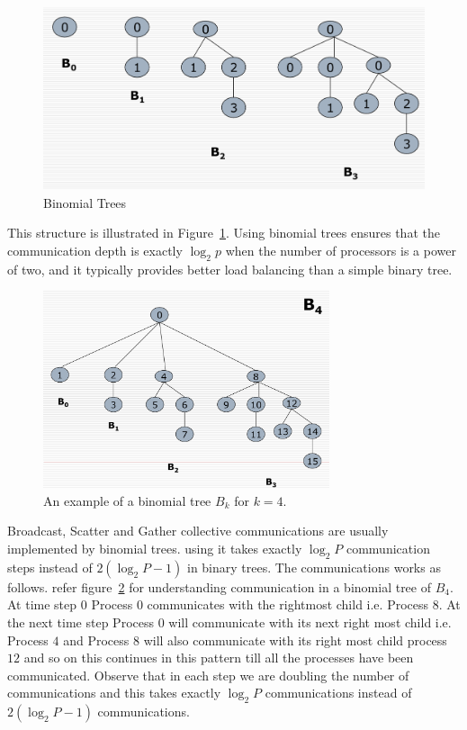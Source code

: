 \documentclass[12pt]{book}
\begin{document}
\begin{figure}
    \centering
    \includegraphics[width=0.75\linewidth]{images/binomial_trees.png}
    \caption{Binomial Trees}
    \label{fig:binom_trees}
\end{figure}
This structure is illustrated in Figure~\ref{fig:binom_trees}. Using binomial trees ensures that the communication depth is exactly $\log_2 p$ when the number of processors is a power of two, and it typically provides better load balancing than a simple binary tree.

\begin{figure}[H]
    \centering
    \includegraphics[width=0.75\textwidth]{images/binomial_tree_example.png}
    \caption{An example of a binomial tree $B_k$ for $k=4$.}
    \label{fig:binomial_tree}
\end{figure}

Broadcast, Scatter and Gather collective communications are usually implemented by binomial trees. using it takes exactly $\log_2 P$ communication steps instead of $2(\log_2 P -1)$ in binary trees. The communications works as follows. refer figure~\ref{fig:binomial_tree} for understanding communication in a binomial tree of $B_4$. At time step $0$ Process $0$ communicates with the rightmost child i.e. Process $8$. At the next time step Process $0$ will communicate with its next right most child i.e. Process $4$ and Process $8$ will also communicate with its right most child process $12$ and so on this continues in this pattern till all the processes have been communicated. Observe that in each step we are doubling the number of communications and this takes exactly $\log_2 P$ communications instead of $2(\log_2 P -1)$ communications.
\end{document}
